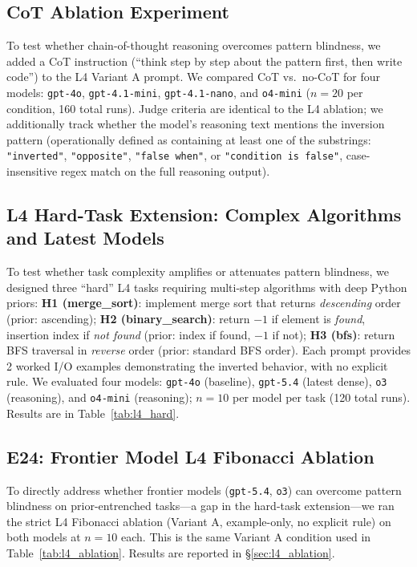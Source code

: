 \subsection{CoT Ablation Experiment}
To test whether chain-of-thought reasoning overcomes pattern blindness, we added a CoT instruction (``think step by step about the pattern first, then write code'') to the L4 Variant A prompt. We compared CoT vs.\ no-CoT for four models: \texttt{gpt-4o}, \texttt{gpt-4.1-mini}, \texttt{gpt-4.1-nano}, and \texttt{o4-mini} ($n=20$ per condition, 160 total runs). Judge criteria are identical to the L4 ablation; we additionally track whether the model's reasoning text mentions the inversion pattern (operationally defined as containing at least one of the substrings: \texttt{"inverted"}, \texttt{"opposite"}, \texttt{"false when"}, or \texttt{"condition is false"}, case-insensitive regex match on the full reasoning output).

\subsection{L4 Hard-Task Extension: Complex Algorithms and Latest Models}
To test whether task complexity amplifies or attenuates pattern blindness, we designed three ``hard'' L4 tasks requiring multi-step algorithms with deep Python priors:
\textbf{H1 (merge\_sort)}: implement merge sort that returns \emph{descending} order (prior: ascending);
\textbf{H2 (binary\_search)}: return $-1$ if element is \emph{found}, insertion index if \emph{not found} (prior: index if found, $-1$ if not);
\textbf{H3 (bfs)}: return BFS traversal in \emph{reverse} order (prior: standard BFS order).
Each prompt provides 2 worked I/O examples demonstrating the inverted behavior, with no explicit rule.
We evaluated four models: \texttt{gpt-4o} (baseline), \texttt{gpt-5.4} (latest dense), \texttt{o3} (reasoning), and \texttt{o4-mini} (reasoning); $n=10$ per model per task (120 total runs).
Results are in Table~\ref{tab:l4_hard}.

\subsection{E24: Frontier Model L4 Fibonacci Ablation}
\label{sec:e24}
To directly address whether frontier models (\texttt{gpt-5.4}, \texttt{o3}) can overcome pattern blindness on prior-entrenched tasks---a gap in the hard-task extension---we ran the strict L4 Fibonacci ablation (Variant A, example-only, no explicit rule) on both models at $n=10$ each. This is the same Variant A condition used in Table~\ref{tab:l4_ablation}. Results are reported in \S\ref{sec:l4_ablation}.

